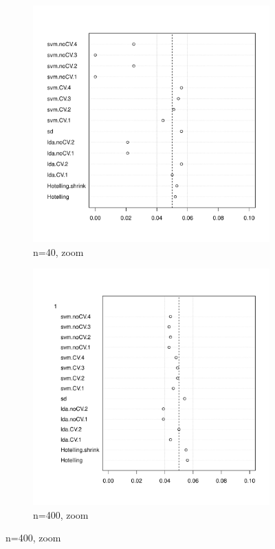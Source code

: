 \documentclass[12pt,a4paper]{article}
\begin{document}
\begin{figure}[h]
\centering
\caption{\footnotesize [TODO].}	
\label{fig:large_sample}
	\begin{subfigure}{.5\textwidth}
	  \centering
	  \includegraphics[width=1\linewidth]{"art/2016-07-27 11:42:05zoom"}
	  \caption{n=40, zoom}  %
	\label{fig:fig:large_sample_1}
	\end{subfigure}%
	\begin{subfigure}{.5\textwidth}
	  \centering
	  \includegraphics[width=1\linewidth]{"art/2016-08-04 13:59:33zoom"}
	  \caption{n=400, zoom} %
	\label{fig:fig:large_sample_2}
	\end{subfigure}
\end{figure}
\end{document}
